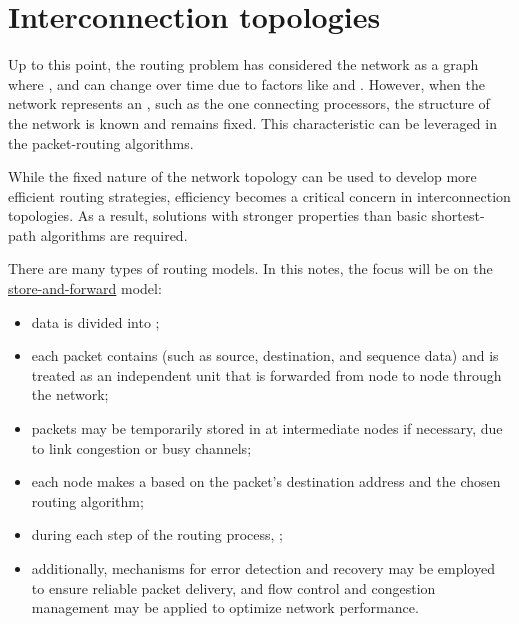 \documentclass[a4paper, 12pt]{report}
\begin{document}

    \section{Interconnection topologies}

    Up to this point, the routing problem has considered the network as a graph where , and can change over time due to factors like  and . However, when the network represents an , such as the one connecting processors, the structure of the network is known and remains fixed. This characteristic can be leveraged in the packet-routing algorithms.

    While the fixed nature of the network topology can be used to develop more efficient routing strategies, efficiency becomes a critical concern in interconnection topologies. As a result, solutions with stronger properties than basic shortest-path algorithms are required.

    There are many types of routing models. In this notes, the focus will be on the \href{https://en.wikipedia.org/wiki/Store_and_forward}{store-and-forward} model:

    \begin{itemize}
        \item data is divided into ;
        \item each packet contains  (such as source, destination, and sequence data) and is treated as an independent unit that is forwarded from node to node through the network;
        \item packets may be temporarily stored in  at intermediate nodes if necessary, due to link congestion or busy channels;
        \item each node makes a  based on the packet's destination address and the chosen routing algorithm;
        \item during each step of the routing process, ;
        \item additionally, mechanisms for error detection and recovery may be employed to ensure reliable packet delivery, and flow control and congestion management may be applied to optimize network performance.
    \end{itemize}
\end{document}
